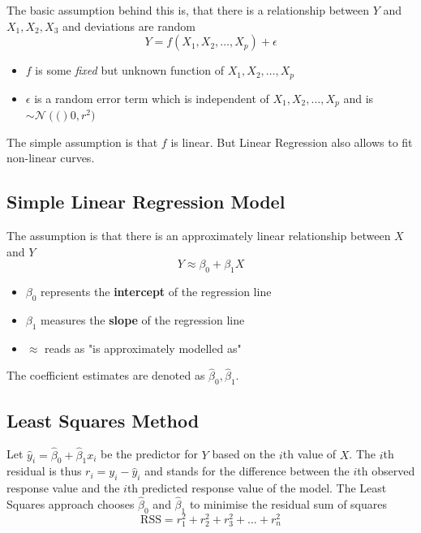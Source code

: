 \documentclass[11pt]{article}
\theoremstyle{definition}
\newcommand*\N[1]{\mathcal{N}\left(#1\right)}
\begin{document}
The basic assumption behind this is, that there is a relationship between $Y$ and $X_1, X_2, X_3$ and deviations are random
\begin{equation*}
	Y = f(X_1, X_2,\dots, X_p) + \epsilon
\end{equation*}
\begin{itemize}
	\item $f$ is some \emph{fixed} but unknown function of $X_1, X_2,\dots, X_p$
	\item $\epsilon$ is a random error term which is independent of $X_1, X_2,\dots, X_p$ and is $\sim\N(0,r^2)$
\end{itemize}
The simple assumption is that $f$ is linear. But Linear Regression also allows to fit non-linear curves.

\subsection{Simple Linear Regression Model}
The assumption is that there is an approximately linear relationship between $X$ and $Y$
\begin{equation*}
	Y \approx \beta_0 + \beta_1 X
\end{equation*}
\begin{itemize}[noitemsep]
	\item $\beta_0$ represents the \textbf{intercept} of the regression line
	\item $\beta_1$ measures the \textbf{slope} of the regression line
	\item $\approx$ reads as "is approximately modelled as"
\end{itemize}
The coefficient estimates are denoted as $\hat{\beta}_0, \hat{\beta}_1$.

\subsection{Least Squares Method}
Let $\hat{y}_i = \hat{\beta}_0 + \hat{\beta}_1 x_i$ be the predictor for $Y$ based on the $i$th value of $X$. The $i$th residual is thus $r_i = y_i - \hat{y}_i$ and stands for the difference between the $i$th observed response value and the $i$th predicted response value of the model. The Least Squares approach chooses $\hat{\beta}_0$ and $\hat{\beta}_1$ to minimise the residual sum of squares
\begin{equation*}
	\text{RSS} = r_1^2 + r_2^2 + r_3^2 + \dots + r_n^2
\end{equation*}
\end{document}

